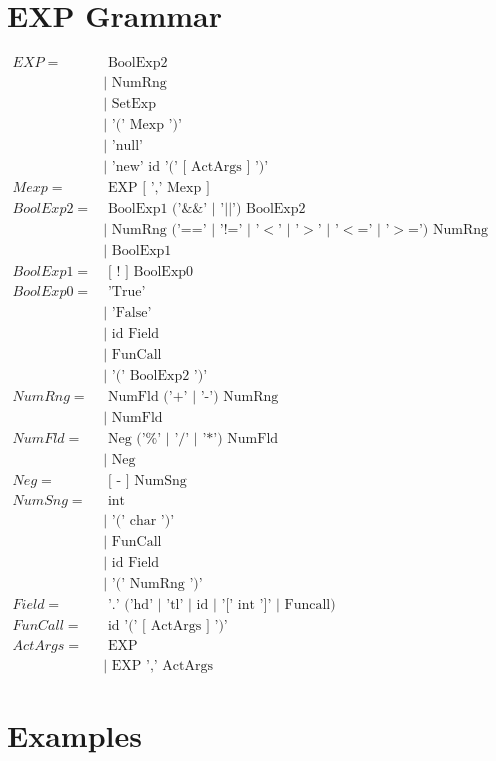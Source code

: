 \documentclass[10pt,a4paper]{article}
\begin{document}
\section{EXP Grammar}
\begin{math}
\begin{aligned}
EXP =& \text{ BoolExp2}
 \\&|\text{ NumRng} 
 \\&|\text{ SetExp }
 \\&|\text{ '(' Mexp ')'}
 \\&|\text{ 'null'}
 \\&|\text{ 'new' id '(' [ ActArgs ] ')'} \\
Mexp =& \text{ EXP [ ',' Mexp ]}\\
BoolExp2 =& \text{ BoolExp1 ('\&\&' $|$ '$||$') BoolExp2}
 \\&|\text{ NumRng ('==' $|$ '!=' $|$ '$<$' $|$ '$>$' $|$ '$<$=' $|$ '$>$=') NumRng}
 \\&|\text{ BoolExp1}\\
BoolExp1 =& \text{ [ ! ] BoolExp0}\\
BoolExp0 =& \text{ 'True'}
 \\&|\text{ 'False'}
 \\&|\text{ id Field}
 \\&|\text{ FunCall}
 \\&|\text{ '(' BoolExp2 ')'}\\
NumRng =& \text{ NumFld ('+' $|$ '-') NumRng}
 \\&|\text{ NumFld}\\
NumFld =& \text{ Neg ('\%' $|$ '/' $|$ '*') NumFld}
 \\&|\text{ Neg}\\
Neg =& \text{ [ - ] NumSng}\\
NumSng =& \text{ int}
 \\&|\text{ '(' char ')' }
 \\&|\text{ FunCall }
 \\&|\text{ id Field}
 \\&|\text{ '(' NumRng ')' }\\
Field =&\text{ '.' ('hd' $|$ 'tl' $|$ id $|$ '[' int ']' $|$ Funcall) }\\
FunCall =&\text{ id '(' [ ActArgs ] ')'} \\
ActArgs =&\text{ EXP }
 \\&|\text{ EXP ',' ActArgs }
\end{aligned}
\end{math}
\section{Examples}
\end{document}

